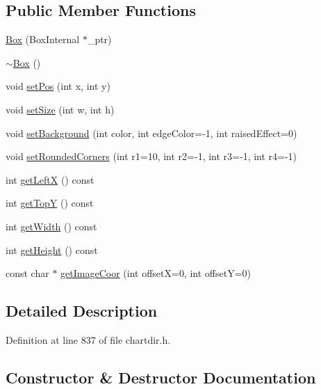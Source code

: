 \subsection*{Public Member Functions}
\begin{DoxyCompactItemize}
\item 
\hyperlink{class_box_a63a008542f76807bed849856c5bcf822}{Box} (Box\+Internal $\ast$\+\_\+ptr)
\item 
\hyperlink{class_box_a6a5e09398e85d602a046b429062fb9c2}{$\sim$\+Box} ()
\item 
void \hyperlink{class_box_ac8dde107dbf1f30374b7c037185fe486}{set\+Pos} (int x, int y)
\item 
void \hyperlink{class_box_a2ec3e1cb522c938cf6927fcb41389bc3}{set\+Size} (int w, int h)
\item 
void \hyperlink{class_box_ac1dd2cb9848de34cf3687a25821fd228}{set\+Background} (int color, int edge\+Color=-\/1, int raised\+Effect=0)
\item 
void \hyperlink{class_box_a6b95c4540afd7f1493742169c01aa0a6}{set\+Rounded\+Corners} (int r1=10, int r2=-\/1, int r3=-\/1, int r4=-\/1)
\item 
int \hyperlink{class_box_a8162cf06a56275fd6a20a5295eac68cd}{get\+LeftX} () const
\item 
int \hyperlink{class_box_af7f965a92d7f745597189882ac76886c}{get\+TopY} () const
\item 
int \hyperlink{class_box_a4feb8db8b03bd71a7235d33ec96c3725}{get\+Width} () const
\item 
int \hyperlink{class_box_a3bfc762d093200d993d77fe89e0c6f18}{get\+Height} () const
\item 
const char $\ast$ \hyperlink{class_box_a75e23fd1fe27b6dd49bbca3477bda886}{get\+Image\+Coor} (int offsetX=0, int offsetY=0)
\end{DoxyCompactItemize}


\subsection{Detailed Description}


Definition at line 837 of file chartdir.\+h.



\subsection{Constructor \& Destructor Documentation}
\mbox{\label{class_box_a63a008542f76807bed849856c5bcf822}} 
